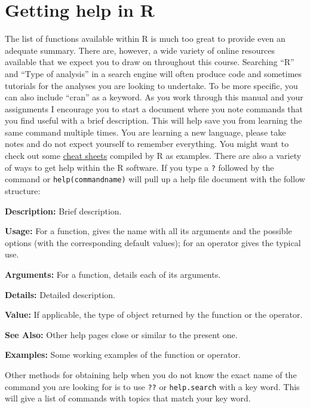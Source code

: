 \documentclass[
]{book}
\begin{document}
\hypertarget{getting-help-in-r}{%
\section{Getting help in R}\label{getting-help-in-r}}

The list of functions available within R is much too great to provide even an adequate summary. There are, however, a wide variety of online resources available that we expect you to draw on throughout this course. Searching ``R'' and ``Type of analysis'' in a search engine will often produce code and sometimes tutorials for the analyses you are looking to undertake. To be more specific, you can also include ``cran'' as a keyword. As you work through this manual and your assignments I encourage you to start a document where you note commands that you find useful with a brief description. This will help save you from learning the same command multiple times. You are learning a new language, please take notes and do not expect yourself to remember everything. You might want to check out some \href{http://r-dir.com/reference/crib-sheets.html\%7C\%7Chttp://r-dir.com/reference/crib-sheets.html}{cheat sheets} compiled by R as examples. There are also a variety of ways to get help within the R software. If you type a \texttt{?} followed by the command or \texttt{help(commandname)} will pull up a help file document with the follow structure:

\textbf{Description:} Brief description.

\textbf{Usage:} For a function, gives the name with all its arguments and the possible options (with the corresponding default values); for an operator gives the typical use.

\textbf{Arguments:} For a function, details each of its arguments.

\textbf{Details:} Detailed description.

\textbf{Value:} If applicable, the type of object returned by the function or the operator.

\textbf{See Also:} Other help pages close or similar to the present one.

\textbf{Examples:} Some working examples of the function or operator.

Other methods for obtaining help when you do not know the exact name of the command you are looking for is to use \texttt{??} or \texttt{help.search} with a key word. This will give a list of commands with topics that match your key word.
\end{document}
